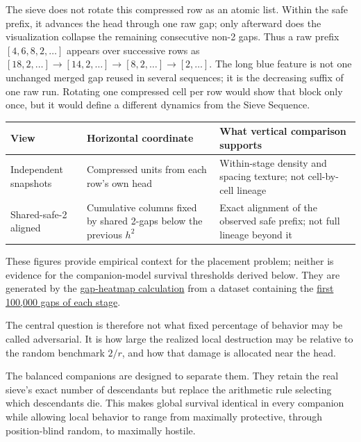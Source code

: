 The sieve does not rotate this compressed row as an atomic list. Within the safe prefix, it advances the head through one raw gap; only afterward does the visualization collapse the remaining consecutive non-2 gaps. Thus a raw prefix $[4,6,8,2,\ldots]$ appears over successive rows as $[18,2,\ldots] \to [14,2,\ldots] \to [8,2,\ldots] \to [2,\ldots]$. The long blue feature is not one unchanged merged gap reused in several sequences; it is the decreasing suffix of one raw run. Rotating one compressed cell per row would show that block only once, but it would define a different dynamics from the Sieve Sequence.
\begin{longtable}{@{}>{\raggedright\arraybackslash}p{}>{\raggedright\arraybackslash}p{}>{\raggedright\arraybackslash}p{}@{}}
\toprule
View & Horizontal coordinate & What vertical comparison supports \\
\midrule
Independent snapshots & Compressed units from each row's own head & Within-stage density and spacing texture; not cell-by-cell lineage \\
Shared-safe-2 aligned & Cumulative columns fixed by shared 2-gaps below the previous $h^2$ & Exact alignment of the observed safe prefix; not full lineage beyond it \\
\bottomrule
\end{longtable}

These figures provide empirical context for the placement problem; neither is evidence for the companion-model survival thresholds derived below. They are generated by the \href{https://github.com/thiagomata/prime-numbers/blob/master/python/src/sieve_sequence/gap_heatmap.py}{gap-heatmap calculation} from a dataset containing the \href{https://github.com/thiagomata/prime-numbers/blob/master/data/sieve-sequence/first_gaps_per_seq.csv}{first 100,000 gaps of each stage}.

The central question is therefore not what fixed percentage of behavior may be called adversarial. It is how large the realized local destruction may be relative to the random benchmark $2/r$, and how that damage is allocated near the head.

The balanced companions are designed to separate them. They retain the real sieve's exact number of descendants but replace the arithmetic rule selecting which descendants die. This makes global survival identical in every companion while allowing local behavior to range from maximally protective, through position-blind random, to maximally hostile.

